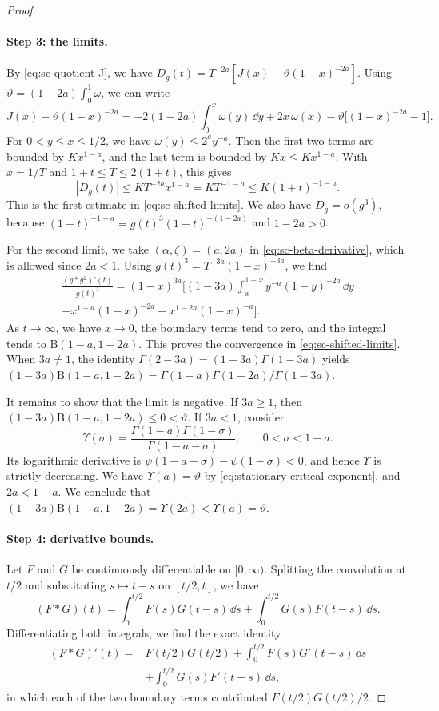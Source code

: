\begin{proof}
\paragraph{Step 3: the limits.} By \eqref{eq:sc-quotient-J}, we have $D_g(t)=T^{-2a}[J(x)-\vartheta(1-x)^{-2a}]$. Using $\vartheta=(1-2a)\int_0^1\omega$, we can write
\[
 J(x)-\vartheta(1-x)^{-2a}
 =-2(1-2a)\int_0^x\omega(y)\,\dd y+2x\,\omega(x)
 -\vartheta\bigl[(1-x)^{-2a}-1\bigr].
\]
For $0<y\le x\le1/2$, we have $\omega(y)\le2^ay^{-a}$. Then the first two terms are bounded by $Kx^{1-a}$, and the last term is bounded by $Kx\le Kx^{1-a}$. With $x=1/T$ and $1+t\le T\le2(1+t)$, this gives
\[
 |D_g(t)|\le KT^{-2a}x^{1-a}=KT^{-1-a}\le K(1+t)^{-1-a}.
\]
This is the first estimate in \eqref{eq:sc-shifted-limits}. We also have $D_g=o(g^3)$, because $(1+t)^{-1-a}=g(t)^3(1+t)^{-(1-2a)}$ and $1-2a>0$.

For the second limit, we take $(\alpha,\zeta)=(a,2a)$ in \eqref{eq:sc-beta-derivative}, which is allowed since $2a<1$. Using $g(t)^3=T^{-3a}(1-x)^{-3a}$, we find
\begin{multline*}
 \frac{(g*g^2)'(t)}{g(t)^3}=(1-x)^{3a}\bigg[(1-3a)\int_x^{1-x}y^{-a}(1-y)^{-2a}\,\dd y\\
 +x^{1-a}(1-x)^{-2a}+x^{1-2a}(1-x)^{-a}\bigg].
\end{multline*}
As $t\to\infty$, we have $x\to0$, the boundary terms tend to zero, and the integral tends to $\mathrm B(1-a,1-2a)$. This proves the convergence in \eqref{eq:sc-shifted-limits}. When $3a\ne1$, the identity $\Gamma(2-3a)=(1-3a)\Gamma(1-3a)$ yields $(1-3a)\mathrm B(1-a,1-2a)=\Gamma(1-a)\Gamma(1-2a)/\Gamma(1-3a)$.

It remains to show that the limit is negative. If $3a\ge1$, then $(1-3a)\mathrm B(1-a,1-2a)\le0<\vartheta$. If $3a<1$, consider
\[
 \Upsilon(\sigma)=\frac{\Gamma(1-a)\Gamma(1-\sigma)}{\Gamma(1-a-\sigma)},\qquad 0<\sigma<1-a .
\]
Its logarithmic derivative is $\psi(1-a-\sigma)-\psi(1-\sigma)<0$, and hence $\Upsilon$ is strictly decreasing. We have $\Upsilon(a)=\vartheta$ by \eqref{eq:stationary-critical-exponent}, and $2a<1-a$. We conclude that $(1-3a)\mathrm B(1-a,1-2a)=\Upsilon(2a)<\Upsilon(a)=\vartheta$.

\paragraph{Step 4: derivative bounds.} Let $F$ and $G$ be continuously differentiable on $[0,\infty)$. Splitting the convolution at $t/2$ and substituting $s\mapsto t-s$ on $[t/2,t]$, we have
\[
 (F*G)(t)=\int_0^{t/2}F(s)G(t-s)\,\dd s+\int_0^{t/2}G(s)F(t-s)\,\dd s .
\]
Differentiating both integrals, we find the exact identity
\begin{align}
 (F*G)'(t)={}&F(t/2)G(t/2)
 +\int_0^{t/2}F(s)G'(t-s)\,\dd s\nonumber\\
 &+\int_0^{t/2}G(s)F'(t-s)\,\dd s,
 \label{eq:sc-midpoint-derivative}
\end{align}
in which each of the two boundary terms contributed $F(t/2)G(t/2)/2$.


\end{proof}
